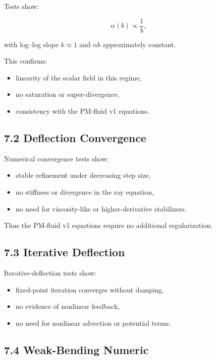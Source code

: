\documentclass{article}
\begin{document}
Tests show:



\[
\alpha(b) \propto \frac{1}{b},
\]



with log–log slope $k \approx 1$ and $\alpha b$ approximately constant.

This confirms:

\begin{itemize}
    \item linearity of the scalar field in this regime,
    \item no saturation or super-divergence,
    \item consistency with the PM-fluid v1 equations.
\end{itemize}

\subsection*{7.2 Deflection Convergence}

Numerical convergence tests show:

\begin{itemize}
    \item stable refinement under decreasing step size,
    \item no stiffness or divergence in the ray equation,
    \item no need for viscosity-like or higher-derivative stabilizers.
\end{itemize}

Thus the PM-fluid v1 equations require no additional regularization.

\subsection*{7.3 Iterative Deflection}

Iterative-deflection tests show:

\begin{itemize}
    \item fixed-point iteration converges without damping,
    \item no evidence of nonlinear feedback,
    \item no need for nonlinear advection or potential terms.
\end{itemize}

\subsection*{7.4 Weak-Bending Numeric}
\end{document}
